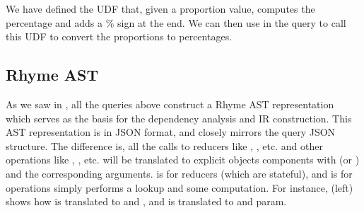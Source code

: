 \documentclass[runningheads]{llncs}
\newcommand{\lang}{Rhyme}
\begin{document}
We have defined the UDF  that, given a proportion value,
computes the percentage and adds a \% sign at the end.
We can then use  in the query to call this UDF to convert the
proportions to percentages.





\vspace{-3mm}
\subsection{\lang{} AST}\label{subsec:ast}
\vspace{-2mm}
As we saw in , all the queries
above construct a \lang{} AST representation which serves as the basis
for the dependency analysis and IR construction.
This AST representation is in JSON format, and closely mirrors the query JSON structure.
The difference is, all the calls to reducers like , , etc.
and other operations like , , etc. will be translated to
explicit objects components with  (or ) and the corresponding
arguments.
 is for reducers (which are stateful), and  is for operations
simply performs a lookup and some computation.
For instance,  (left) shows how  is translated to 
and , and  is translated to  and param.
\end{document}
